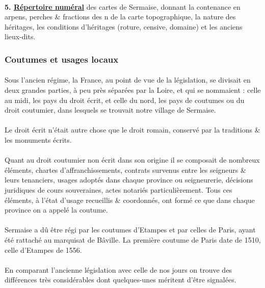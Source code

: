 \documentclass[../eBook.tex]{subfiles}
\begin{document}
      \paragraph{}\textbf{5. \underline{Répertoire numéral}} des cartes de Sermaise, donnant la contenance en arpens, perches \& fractions des n de la carte topographique, la nature des héritages, les conditions d'héritages (roture, censive, domaine) et les anciens lieux-dits.

    \subsubsection*{Coutumes et usages locaux}
      \paragraph{}Sous l'ancien régime, la France, au point de vue de la législation, se divisait en deux grandes parties, à peu près séparées par la Loire, et qui se nommaient : celle au midi, les pays du droit écrit, et celle du nord, les pays de coutumes ou du droit coutumier, dans lesquels se trouvait notre village de Sermaise.
      \paragraph{}Le droit écrit n'était autre chose que le droit romain, conservé par la traditions \& les monuments écrits.
      \paragraph{}Quant au droit coutumier non écrit dans son origine il se composait de nombreux éléments, chartes d'affranchissements, contrats survenus entre les seigneurs \& leurs tenanciers, usages adoptés dans chaque province ou seigneurerie, décisions juridiques de cours souveraines, actes notariés particulièrement. Tous ces éléments, à l'état d'usage recueillis \& coordonnés, ont formé ce que dans chaque province on a appelé la coutume.
      \paragraph{}Sermaise a dû être régi par les coutumes d'Etampes et par celles de Paris, ayant été rattaché au marquisat de Bâville. La première coutume de Paris date de 1510, celle d'Etampes de 1556.
      \paragraph{}En comparant l'ancienne législation avec celle de nos jours on trouve des différences très considérables dont quelques-unes méritent d'être signalées.
\end{document}
